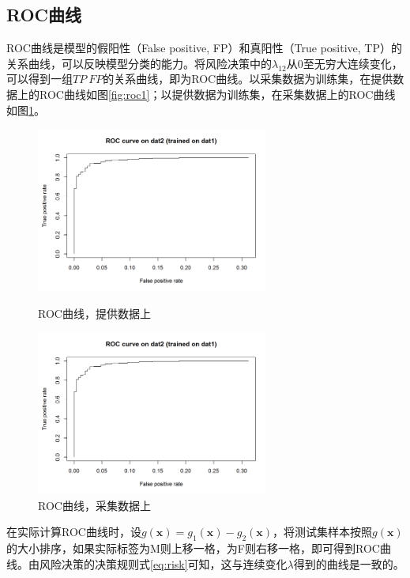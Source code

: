 \subsection{ROC曲线}
ROC曲线是模型的假阳性（False positive, FP）和真阳性（True positive, TP）的关系曲线，可以反映模型分类的能力。将风险决策中的$\lambda_{12}$从0至无穷大连续变化，可以得到一组$TP~FP$的关系曲线，即为ROC曲线。以采集数据为训练集，在提供数据上的ROC曲线如图\ref{fig:roc1}；以提供数据为训练集，在采集数据上的ROC曲线如图\ref{fig:roc2}。
\begin{figure}[htbp]
\begin{minipage}[t]{0.5\linewidth}
\centering
\includegraphics[width=3in]{resource/roc1.png}
\caption{ROC曲线，提供数据上}
\label{fig:roc1}
\end{minipage}
\begin{minipage}[t]{0.5\linewidth}
\centering
\includegraphics[width=3in]{resource/roc1.png}
\caption{ROC曲线，采集数据上}
\label{fig:roc2}
\end{minipage}
\end{figure}

在实际计算ROC曲线时，设$g(\mathbf{x})=g_1(\mathbf{x})-g_2(\mathbf{x})$，将测试集样本按照$g(\mathbf{x})$的大小排序，如果实际标签为M则上移一格，为F则右移一格，即可得到ROC曲线。由风险决策的决策规则式\ref{eq:risk}可知，这与连续变化$\lambda$得到的曲线是一致的。

